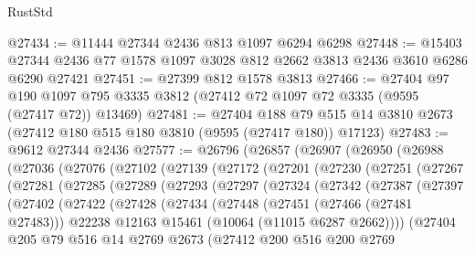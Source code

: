 \begin{lexlean}{RustStd}
\begin{coremodule}
@27434 := @11444 @27344 @2436 @813 @1097 @6294 @6298
@27448 := @15403 @27344 @2436 @77 @1578 @1097 @3028 @812 @2662 @3813 @2436 @3610 @6286 @6290 @27421
@27451 := @27399 @812 @1578 @3813
@27466 := @27404
    @97
    @190
    @1097
    @795
    @3335
    @3812
    (@27412 @72 @1097 @72 @3335 (@9595 (@27417 @72)) @13469)
@27481 := @27404
    @188
    @79
    @515
    @14
    @3810
    @2673
    (@27412 @180 @515 @180 @3810 (@9595 (@27417 @180)) @17123)
@27483 := @9612 @27344 @2436
@27577 := @26796
    (@26857
      (@26907
        (@26950
          (@26988
            (@27036
              (@27076
                (@27102
                  (@27139
                    (@27172
                      (@27201
                        (@27230
                          (@27251
                            (@27267
                              (@27281
                                (@27285
                                  (@27289
                                    (@27293
                                      (@27297
                                        (@27324
                                          (@27342
                                            (@27387
                                              (@27397
                                                (@27402
                                                  (@27422
                                                    (@27428
                                                      (@27434
                                                        (@27448
                                                          (@27451 (@27466 (@27481 @27483)))
                                                          @22238
                                                          @12163
                                                          @15461
                                                          (@10064 (@11015 @6287 @2662))))
                                                      (@27404
                                                        @205
                                                        @79
                                                        @516
                                                        @14
                                                        @2769
                                                        @2673
                                                        (@27412
                                                          @200
                                                          @516
                                                          @200
                                                          @2769

\end{coremodule}
\end{lexlean}
